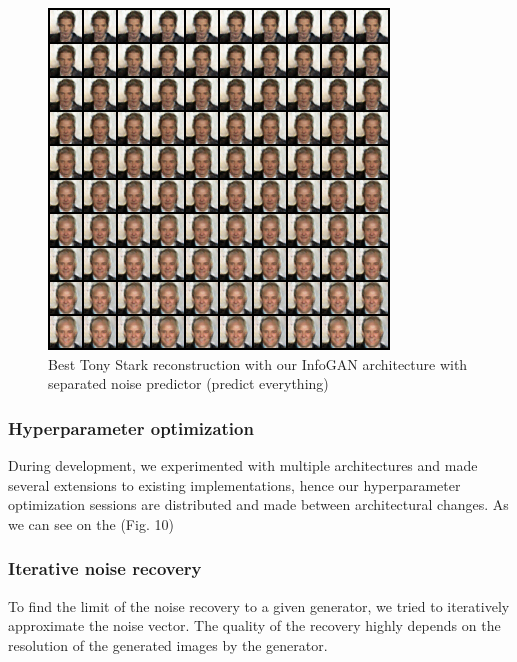 \documentclass{egpubl}
\begin{document}
\begin{figure}[!htb]
	\centering
	\includegraphics[width=1\linewidth]{pic/predict_everything}
	\caption{Best Tony Stark reconstruction with our InfoGAN architecture with separated noise predictor (predict everything)}
	\label{fig:best3}
\end{figure}



\subsubsection{Hyperparameter optimization}

During development, we experimented with multiple architectures and made several extensions to existing implementations, hence our hyperparameter optimization sessions are distributed and made between architectural changes. As we can see on the (Fig. 10)

\subsubsection{Iterative noise recovery}

To find the limit of the noise recovery to a given generator, we tried to iteratively approximate the noise vector. The quality of the recovery highly depends on the resolution of the generated images by the generator.
\end{document}

